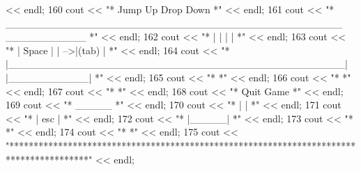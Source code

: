 \begin{DoxyCode}
      << endl;
160         cout << \textcolor{stringliteral}{"*                               Jump Up                         Drop Down              *"} 
      << endl;
161         cout << \textcolor{stringliteral}{"*           \_\_\_\_\_\_\_\_\_\_\_\_\_\_\_\_\_\_\_\_\_\_\_\_\_\_\_\_\_\_\_\_\_\_\_\_\_\_\_\_\_\_\_\_\_\_     \_\_\_\_\_\_\_\_\_\_\_             *"} 
      << endl;
162         cout << \textcolor{stringliteral}{"*          |                                              |   |           |            *"} 
      << endl;
163         cout << \textcolor{stringliteral}{"*          |                     Space                    |   | -->|(tab) |            *"} 
      << endl;
164         cout << \textcolor{stringliteral}{"*          |\_\_\_\_\_\_\_\_\_\_\_\_\_\_\_\_\_\_\_\_\_\_\_\_\_\_\_\_\_\_\_\_\_\_\_\_\_\_\_\_\_\_\_\_\_\_|   |\_\_\_\_\_\_\_\_\_\_\_|            *"} 
      << endl;
165         cout << \textcolor{stringliteral}{"*                                                                                      *"} 
      << endl;
166         cout << \textcolor{stringliteral}{"*                                                                                      *"} 
      << endl;
167         cout << \textcolor{stringliteral}{"*                                                                                      *"} 
      << endl;
168         cout << \textcolor{stringliteral}{"*                                       Quit Game                                      *"} 
      << endl;
169         cout << \textcolor{stringliteral}{"*                                         \_\_\_\_\_                                        *"} 
      << endl;
170         cout << \textcolor{stringliteral}{"*                                        |     |                                       *"} 
      << endl;
171         cout << \textcolor{stringliteral}{"*                                        | esc |                                       *"} 
      << endl;
172         cout << \textcolor{stringliteral}{"*                                        |\_\_\_\_\_|                                       *"} 
      << endl;
173         cout << \textcolor{stringliteral}{"*                                                                                      *"} 
      << endl;
174         cout << \textcolor{stringliteral}{"*                                                                                      *"} 
      << endl;
175         cout << \textcolor{stringliteral}{"****************************************************************************************"} 
      << endl;

\end{DoxyCode}
